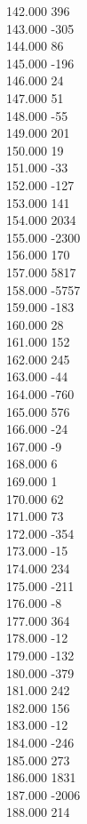 { 142.000	396 \\
 143.000	-305 \\
 144.000	86 \\
 145.000	-196 \\
 146.000	24 \\
 147.000	51 \\
 148.000	-55 \\
 149.000	201 \\
 150.000	19 \\
 151.000	-33 \\
 152.000	-127 \\
 153.000	141 \\
 154.000	2034 \\
 155.000	-2300 \\
 156.000	170 \\
 157.000	5817 \\
 158.000	-5757 \\
 159.000	-183 \\
 160.000	28 \\
 161.000	152 \\
 162.000	245 \\
 163.000	-44 \\
 164.000	-760 \\
 165.000	576 \\
 166.000	-24 \\
 167.000	-9 \\
 168.000	6 \\
 169.000	1 \\
 170.000	62 \\
 171.000	73 \\
 172.000	-354 \\
 173.000	-15 \\
 174.000	234 \\
 175.000	-211 \\
 176.000	-8 \\
 177.000	364 \\
 178.000	-12 \\
 179.000	-132 \\
 180.000	-379 \\
 181.000	242 \\
 182.000	156 \\
 183.000	-12 \\
 184.000	-246 \\
 185.000	273 \\
 186.000	1831 \\
 187.000	-2006 \\
 188.000	214 \\
}
